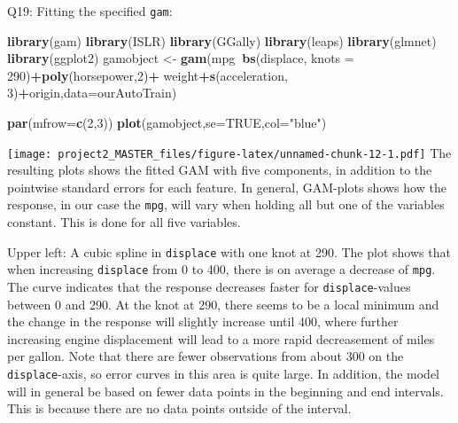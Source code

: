 \documentclass[]{article}
\newenvironment{Shaded}{\begin{snugshade}}{\end{snugshade}}
\newcommand{\KeywordTok}[1]{\textcolor[rgb]{0.13,0.29,0.53}{\textbf{#1}}}
\newcommand{\DataTypeTok}[1]{\textcolor[rgb]{0.13,0.29,0.53}{#1}}
\newcommand{\DecValTok}[1]{\textcolor[rgb]{0.00,0.00,0.81}{#1}}
\newcommand{\StringTok}[1]{\textcolor[rgb]{0.31,0.60,0.02}{#1}}
\newcommand{\OtherTok}[1]{\textcolor[rgb]{0.56,0.35,0.01}{#1}}
\newcommand{\OperatorTok}[1]{\textcolor[rgb]{0.81,0.36,0.00}{\textbf{#1}}}
\newcommand{\NormalTok}[1]{#1}
\begin{document}
Q19: Fitting the specified \texttt{gam}:

\begin{Shaded}
\begin{Highlighting}[]
\KeywordTok{library}\NormalTok{(gam)}
\KeywordTok{library}\NormalTok{(ISLR)}
\KeywordTok{library}\NormalTok{(GGally)}
\KeywordTok{library}\NormalTok{(leaps)}
\KeywordTok{library}\NormalTok{(glmnet)}
\KeywordTok{library}\NormalTok{(ggplot2)}
\NormalTok{gamobject <-}\StringTok{ }\KeywordTok{gam}\NormalTok{(mpg}\OperatorTok{~}\KeywordTok{bs}\NormalTok{(displace, }\DataTypeTok{knots =} \DecValTok{290}\NormalTok{)}\OperatorTok{+}\KeywordTok{poly}\NormalTok{(horsepower,}\DecValTok{2}\NormalTok{)}\OperatorTok{+}
\StringTok{                   }\NormalTok{weight}\OperatorTok{+}\KeywordTok{s}\NormalTok{(acceleration, }\DecValTok{3}\NormalTok{)}\OperatorTok{+}\NormalTok{origin,}\DataTypeTok{data=}\NormalTok{ourAutoTrain)}

\KeywordTok{par}\NormalTok{(}\DataTypeTok{mfrow=}\KeywordTok{c}\NormalTok{(}\DecValTok{2}\NormalTok{,}\DecValTok{3}\NormalTok{))}
\KeywordTok{plot}\NormalTok{(gamobject,}\DataTypeTok{se=}\OtherTok{TRUE}\NormalTok{,}\DataTypeTok{col=}\StringTok{"blue"}\NormalTok{)}
\end{Highlighting}
\end{Shaded}

\texttt{[image: project2\_MASTER\_files/figure-latex/unnamed-chunk-12-1.pdf]}
The resulting plots shows the fitted GAM with five components, in
addition to the pointwise standard errors for each feature. In general,
GAM-plots shows how the response, in our case the \texttt{mpg}, will
vary when holding all but one of the variables constant. This is done
for all five variables.

Upper left: A cubic spline in \texttt{displace} with one knot at 290.
The plot shows that when increasing \texttt{displace} from 0 to 400,
there is on average a decrease of \texttt{mpg}. The curve indicates that
the response decreases faster for \texttt{displace}-values between 0 and
290. At the knot at 290, there seems to be a local minimum and the
change in the response will slightly increase until 400, where further
increasing engine displacement will lead to a more rapid decreasement of
miles per gallon. Note that there are fewer observations from about 300
on the \texttt{displace}-axis, so error curves in this area is quite
large. In addition, the model will in general be based on fewer data
points in the beginning and end intervals. This is because there are no
data points outside of the interval.
\end{document}
